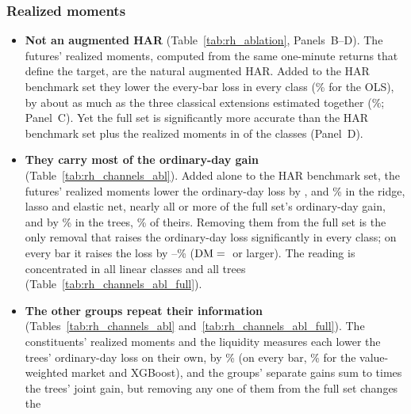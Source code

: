 \subsubsection{Realized moments}
\label{sec:rh_fi_ordinary}
\label{sec:rh_results_bench}
\begin{itemize}
\item \textbf{Not an augmented HAR} (Table~\ref{tab:rh_ablation}, Panels~B--D). The futures' realized moments,
  computed from the same one-minute returns that define the target, are the natural augmented HAR. Added to the HAR
  benchmark set they lower the every-bar loss in every class (\rhabOlsAddRmAllPct\% for the OLS), by about as much as
  the three classical extensions estimated together (\rhabOlsSharqlAllPct\%; Panel~C). Yet the full set is
  significantly more accurate than the HAR benchmark set plus the realized moments in \rhabNClassesBeatAddRm{} of the
  \rhabNClassesAddRm{} classes (Panel~D).
\item \textbf{They carry most of the ordinary-day gain} (Table~\ref{tab:rh_channels_abl}). Added alone to the HAR
  benchmark set, the futures' realized moments lower the ordinary-day loss by \rhchRidgeOrdAddRmPct,
  \rhchLassoOrdAddRmPct{} and \rhchEnetOrdAddRmPct\% in the ridge, lasso and elastic net, nearly all or more of the
  full set's ordinary-day gain, and by \rhchOrdAddRmTreeRng\% in the trees, \rhchOrdRmShareTreeRng\% of theirs. Removing
  them from the full set is the only removal that raises the ordinary-day loss significantly in every class; on every
  bar it raises the loss by \rhabLoRmAllPctMin--\rhabLoRmAllPctMax\% ($\mathrm{DM}={}$\rhabLoRmAllDmMin{} or larger). The
  reading is concentrated in all \rhchLinOrdNConcTest{} linear classes and all \rhchTreeOrdNConcTest{} trees
  (Table~\ref{tab:rh_channels_abl_full}).
\item \textbf{The other groups repeat their information} (Tables~\ref{tab:rh_channels_abl}
  and~\ref{tab:rh_channels_abl_full}). The constituents' realized moments and the liquidity
  measures each lower the trees' ordinary-day loss on their own, by \rhchOrdAddOtherTreeRng\% (on every bar,
  \rhabXgbAddVwAllPct\% for the value-weighted market and XGBoost), and the groups' separate gains sum to
  \rhchOrdSumRatioTreeRng{} times the trees' joint gain, but removing any one of them from the full set changes the

\end{itemize}
